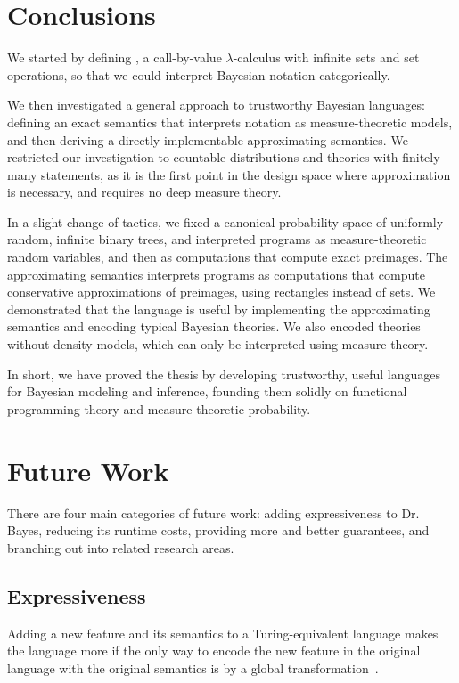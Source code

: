
\section{Conclusions}

We started by defining \lzfclang, a call-by-value $\lambda$-calculus with infinite sets and set operations, so that we could interpret Bayesian notation categorically.

We then investigated a general approach to trustworthy Bayesian languages: defining an exact semantics that interprets notation as measure-theoretic models, and then deriving a directly implementable approximating semantics.
We restricted our investigation to countable distributions and theories with finitely many statements, as it is the first point in the design space where approximation is necessary, and requires no deep measure theory.

In a slight change of tactics, we fixed a canonical probability space of uniformly random, infinite binary trees, and interpreted programs as measure-theoretic random variables, and then as computations that compute exact preimages.
The approximating semantics interprets programs as computations that compute conservative approximations of preimages, using rectangles instead of sets.
We demonstrated that the language is useful by implementing the approximating semantics and encoding typical Bayesian theories.
We also encoded theories without density models, which can only be interpreted using measure theory.

In short, we have proved the thesis by developing trustworthy, useful languages for Bayesian modeling and inference, founding them solidly on functional programming theory and measure-theoretic probability.

\section{Future Work}

There are four main categories of future work: adding expressiveness to Dr. Bayes, reducing its runtime costs, providing more and better guarantees, and branching out into related research areas.

\subsection{Expressiveness}

Adding a new feature and its semantics to a Turing-equivalent language makes the language more  if the only way to encode the new feature in the original language with the original semantics is by a global transformation~\cite{cit:felleisen-1990scp-expressive}.

